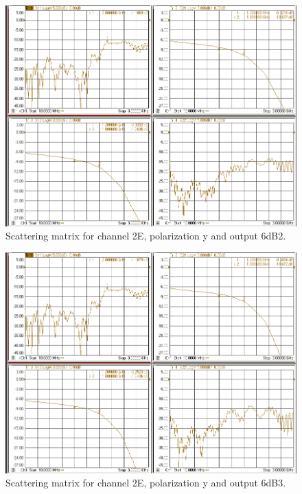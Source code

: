 \documentclass[12pt,a4paper,oneside]{article}
\begin{document}
\begin{figure}[H]
\centering
\includegraphics[width=0.9\linewidth]{VNA_results/2Ey_6dB2.png}
\caption{Scattering matrix for channel 2E, polarization y and output 6dB2.}
\label{fig:2Ey_6dB2}
\end{figure}


\begin{figure}[H]
\centering
\includegraphics[width=0.9\linewidth]{VNA_results/2Ey_6dB3.png}
\caption{Scattering matrix for channel 2E, polarization y and output 6dB3.}
\label{fig:2Ey_6dB3}
\end{figure}
\end{document}
